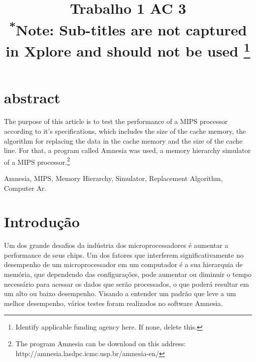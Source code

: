\documentclass[conference]{IEEEtran}
\begin{document}
\title{Trabalho 1 AC 3\\
{\footnotesize \textsuperscript{*}Note: Sub-titles are not captured in Xplore and
should not be used}
\thanks{Identify applicable funding agency here. If none, delete this.}
}

\author{
\and
{}
}

\maketitle

\section{abstract}
The purpose of this article is to test the performance of a MIPS processor according to it’s specifications, which includes the size of the cache memory, the algorithm for replacing the data in the cache memory and the size of the cache line. For that, a program called Amnesia was used, a memory hierarchy simulator of a MIPS processor.\footnote{The program Amnesia can be download on this address: http://amnesia.lasdpc.icmc.usp.br/amnesia-en/}

\begin{IEEEkeywords}
Amnesia, MIPS, Memory Hierarchy, Simulator, Replacement Algorithm, Computer Ar.
\end{IEEEkeywords}

\section{Introdução}
Um dos grande desafios da indústria dos microprocessadores é aumentar a performance de seus chips. Um dos fatores que interferem significativamente no desempenho de um microprocessador em um computador é a sua hierarquia de memória, que dependendo das configurações, pode aumentar ou diminuir o tempo necessário para acessar os dados que serão processados, o que poderá resultar em um alto ou baixo desempenho. Visando a entender um padrão que leve a um melhor desempenho, vários testes foram realizados no software Amnesia.
\end{document}
